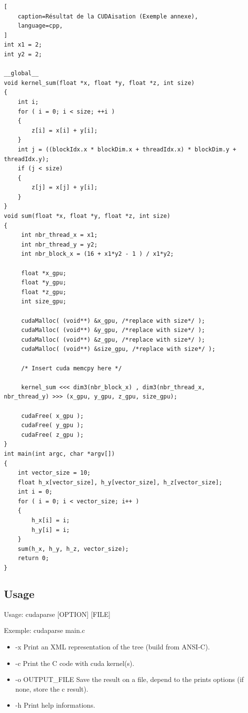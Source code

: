 \documentclass{article}
\begin{document}
	\begin{lstlisting}[
	caption=Résultat de la CUDAisation (Exemple annexe),
    language=cpp,
]
int x1 = 2;
int y2 = 2;

__global__
void kernel_sum(float *x, float *y, float *z, int size)
{
	int i;
	for ( i = 0; i < size; ++i )
	{
		z[i] = x[i] + y[i];
	}
	int j = ((blockIdx.x * blockDim.x + threadIdx.x) * blockDim.y + threadIdx.y);
	if (j < size)
	{
		z[j] = x[j] + y[i];
	}
}
void sum(float *x, float *y, float *z, int size)
{
	 int nbr_thread_x = x1;
	 int nbr_thread_y = y2;
	 int nbr_block_x = (16 + x1*y2 - 1 ) / x1*y2;
	
	 float *x_gpu;
	 float *y_gpu;
	 float *z_gpu;
	 int size_gpu;
	 
  	 cudaMalloc( (void**) &x_gpu, /*replace with size*/ );
  	 cudaMalloc( (void**) &y_gpu, /*replace with size*/ );
  	 cudaMalloc( (void**) &z_gpu, /*replace with size*/ );
  	 cudaMalloc( (void**) &size_gpu, /*replace with size*/ );
  
     /* Insert cuda memcpy here */
	
	 kernel_sum <<< dim3(nbr_block_x) , dim3(nbr_thread_x, nbr_thread_y) >>> (x_gpu, y_gpu, z_gpu, size_gpu);
	 
	 cudaFree( x_gpu );
  	 cudaFree( y_gpu );
  	 cudaFree( z_gpu );	 
}
int main(int argc, char *argv[])
{
	int vector_size = 10;
	float h_x[vector_size], h_y[vector_size], h_z[vector_size];
	int i = 0;
	for ( i = 0; i < vector_size; i++ )
	{
		h_x[i] = i;
		h_y[i] = i;
	}
	sum(h_x, h_y, h_z, vector_size);
	return 0;
}

\end{lstlisting}

\subsection{Usage}

Usage: cudaparse [OPTION] [FILE]

Exemple: cudaparse main.c
\begin{itemize}

\item -x  		 Print an XML representation of the tree (build from ANSI-C).
\item -c  		 Print the C code with cuda kernel(s).
\item -o OUTPUT\_FILE 	 Save the result on a file, depend to the prints options (if none, store the c result).
\item -h 		 Print help informations.

\end{itemize}
\end{document}
